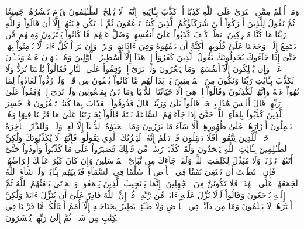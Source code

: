 وَمَنۡ أَظۡلَمُ مِمَّنِ ٱفۡتَرَىٰ عَلَى ٱللَّهِ كَذِبًا أَوۡ كَذَّبَ بِـَٔايَٰتِهِۦٓۚ إِنَّهُۥ لَا يُفۡلِحُ ٱلظَّـٰلِمُونَ
وَيَوۡمَ نَحۡشُرُهُمۡ جَمِيعٗا ثُمَّ نَقُولُ لِلَّذِينَ أَشۡرَكُوٓاْ أَيۡنَ شُرَكَآؤُكُمُ ٱلَّذِينَ كُنتُمۡ تَزۡعُمُونَ
ثُمَّ لَمۡ تَكُن فِتۡنَتُهُمۡ إِلَّآ أَن قَالُواْ وَٱللَّهِ رَبِّنَا مَا كُنَّا مُشۡرِكِينَ
ٱنظُرۡ كَيۡفَ كَذَبُواْ عَلَىٰٓ أَنفُسِهِمۡۚ وَضَلَّ عَنۡهُم مَّا كَانُواْ يَفۡتَرُونَ
وَمِنۡهُم مَّن يَسۡتَمِعُ إِلَيۡكَۖ وَجَعَلۡنَا عَلَىٰ قُلُوبِهِمۡ أَكِنَّةً أَن يَفۡقَهُوهُ وَفِيٓ ءَاذَانِهِمۡ وَقۡرٗاۚ وَإِن يَرَوۡاْ كُلَّ ءَايَةٖ لَّا يُؤۡمِنُواْ بِهَاۖ حَتَّىٰٓ إِذَا جَآءُوكَ يُجَٰدِلُونَكَ يَقُولُ ٱلَّذِينَ كَفَرُوٓاْ إِنۡ هَٰذَآ إِلَّآ أَسَٰطِيرُ ٱلۡأَوَّلِينَ
وَهُمۡ يَنۡهَوۡنَ عَنۡهُ وَيَنۡـَٔوۡنَ عَنۡهُۖ وَإِن يُهۡلِكُونَ إِلَّآ أَنفُسَهُمۡ وَمَا يَشۡعُرُونَ
وَلَوۡ تَرَىٰٓ إِذۡ وُقِفُواْ عَلَى ٱلنَّارِ فَقَالُواْ يَٰلَيۡتَنَا نُرَدُّ وَلَا نُكَذِّبَ بِـَٔايَٰتِ رَبِّنَا وَنَكُونَ مِنَ ٱلۡمُؤۡمِنِينَ
بَلۡ بَدَا لَهُم مَّا كَانُواْ يُخۡفُونَ مِن قَبۡلُۖ وَلَوۡ رُدُّواْ لَعَادُواْ لِمَا نُهُواْ عَنۡهُ وَإِنَّهُمۡ لَكَٰذِبُونَ
وَقَالُوٓاْ إِنۡ هِيَ إِلَّا حَيَاتُنَا ٱلدُّنۡيَا وَمَا نَحۡنُ بِمَبۡعُوثِينَ
وَلَوۡ تَرَىٰٓ إِذۡ وُقِفُواْ عَلَىٰ رَبِّهِمۡۚ قَالَ أَلَيۡسَ هَٰذَا بِٱلۡحَقِّۚ قَالُواْ بَلَىٰ وَرَبِّنَاۚ قَالَ فَذُوقُواْ ٱلۡعَذَابَ بِمَا كُنتُمۡ تَكۡفُرُونَ
قَدۡ خَسِرَ ٱلَّذِينَ كَذَّبُواْ بِلِقَآءِ ٱللَّهِۖ حَتَّىٰٓ إِذَا جَآءَتۡهُمُ ٱلسَّاعَةُ بَغۡتَةٗ قَالُواْ يَٰحَسۡرَتَنَا عَلَىٰ مَا فَرَّطۡنَا فِيهَا وَهُمۡ يَحۡمِلُونَ أَوۡزَارَهُمۡ عَلَىٰ ظُهُورِهِمۡۚ أَلَا سَآءَ مَا يَزِرُونَ
وَمَا ٱلۡحَيَوٰةُ ٱلدُّنۡيَآ إِلَّا لَعِبٞ وَلَهۡوٞۖ وَلَلدَّارُ ٱلۡأٓخِرَةُ خَيۡرٞ لِّلَّذِينَ يَتَّقُونَۚ أَفَلَا تَعۡقِلُونَ
قَدۡ نَعۡلَمُ إِنَّهُۥ لَيَحۡزُنُكَ ٱلَّذِي يَقُولُونَۖ فَإِنَّهُمۡ لَا يُكَذِّبُونَكَ وَلَٰكِنَّ ٱلظَّـٰلِمِينَ بِـَٔايَٰتِ ٱللَّهِ يَجۡحَدُونَ
وَلَقَدۡ كُذِّبَتۡ رُسُلٞ مِّن قَبۡلِكَ فَصَبَرُواْ عَلَىٰ مَا كُذِّبُواْ وَأُوذُواْ حَتَّىٰٓ أَتَىٰهُمۡ نَصۡرُنَاۚ وَلَا مُبَدِّلَ لِكَلِمَٰتِ ٱللَّهِۚ وَلَقَدۡ جَآءَكَ مِن نَّبَإِيْ ٱلۡمُرۡسَلِينَ
وَإِن كَانَ كَبُرَ عَلَيۡكَ إِعۡرَاضُهُمۡ فَإِنِ ٱسۡتَطَعۡتَ أَن تَبۡتَغِيَ نَفَقٗا فِي ٱلۡأَرۡضِ أَوۡ سُلَّمٗا فِي ٱلسَّمَآءِ فَتَأۡتِيَهُم بِـَٔايَةٖۚ وَلَوۡ شَآءَ ٱللَّهُ لَجَمَعَهُمۡ عَلَى ٱلۡهُدَىٰۚ فَلَا تَكُونَنَّ مِنَ ٱلۡجَٰهِلِينَ
۞إِنَّمَا يَسۡتَجِيبُ ٱلَّذِينَ يَسۡمَعُونَۘ وَٱلۡمَوۡتَىٰ يَبۡعَثُهُمُ ٱللَّهُ ثُمَّ إِلَيۡهِ يُرۡجَعُونَ
وَقَالُواْ لَوۡلَا نُزِّلَ عَلَيۡهِ ءَايَةٞ مِّن رَّبِّهِۦۚ قُلۡ إِنَّ ٱللَّهَ قَادِرٌ عَلَىٰٓ أَن يُنَزِّلَ ءَايَةٗ وَلَٰكِنَّ أَكۡثَرَهُمۡ لَا يَعۡلَمُونَ
وَمَا مِن دَآبَّةٖ فِي ٱلۡأَرۡضِ وَلَا طَـٰٓئِرٖ يَطِيرُ بِجَنَاحَيۡهِ إِلَّآ أُمَمٌ أَمۡثَالُكُمۚ مَّا فَرَّطۡنَا فِي ٱلۡكِتَٰبِ مِن شَيۡءٖۚ ثُمَّ إِلَىٰ رَبِّهِمۡ يُحۡشَرُونَ
